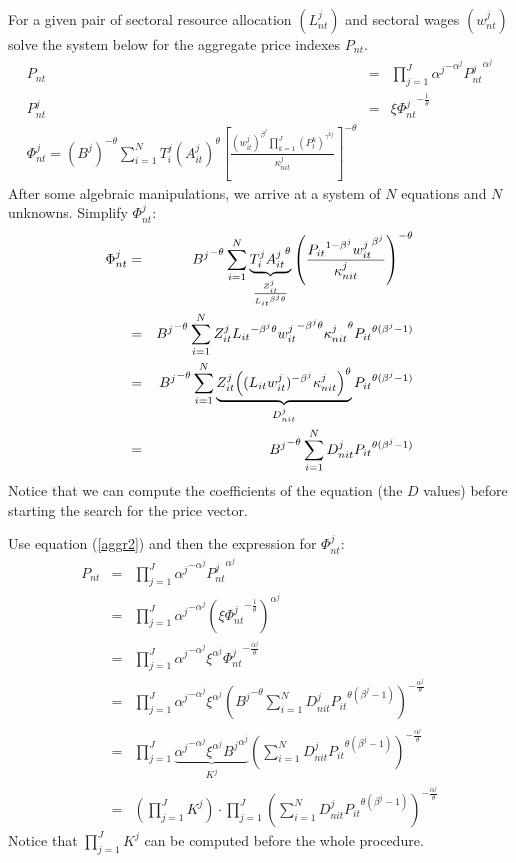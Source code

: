 \documentclass[12pt]{article}
\begin{document}
For a given pair of sectoral resource allocation $(L_{nt}^j)$ and sectoral
wages $(w_{nt}^j)$ solve the system below for the aggregate price indexes $%
P_{nt}.$ 
\begin{eqnarray}
P_{nt} &=& \prod_{j = 1}^J {\alpha^j}^{- \alpha^j} {P_{nt}^j}^{\alpha^j}
\label{aggr1} \\
P_{nt}^j &=& \xi {\Phi_{nt}^j}^{-\frac{1}{\theta}}  \label{aggr2} \\
\Phi _{nt}^{j}=\left( B^{j}\right) ^{-\theta
}\sum\nolimits_{i=1}^{N}T_{i}^{j}\left( A_{it}^{j}\right) ^{\theta }\left[ 
\frac{\left( w_{it}^{j}\right) ^{\beta
^{j}}\prod_{k=1}^{J}(P_{t}^{k})^{\gamma ^{kj}}}{\kappa _{nit}^{j}}\right]
^{-\theta }  \label{eq3}
\end{eqnarray}
After some algebraic manipulations, we arrive at a system of $N$ equations and $N$
unknowns. Simplify $\Phi_{nt}^j:$ 
\begin{eqnarray*}
\Phi_{nt}^j &=& {B^j}^{-\theta} \sum_{i = 1}^N \underbrace{T_i^j {A_{it}^j}%
^{\theta}}_{\frac{Z_{it}^j}{{L_{it}}^{\beta^j\theta}}} \left(\frac{{P_{it}}%
^{1 - \beta^j} {w_{it}^j}^{\beta^j}}{\kappa_{nit}^j}\right)^{-\theta} \\
&=& {B^j}^{-\theta} \sum_{i = 1}^N Z_{it}^j {L_{it}}^{- \beta^j\theta} {%
w_{it}^j}^{-\beta^j\theta} {\kappa_{nit}^j}^{\theta}{P_{it}}^{\theta(\beta^j
- 1)} \\
&=& {B^j}^{-\theta} \sum_{i = 1}^N \underbrace{Z_{it}^j {%
\left((L_{it}w_{it}^j)^{- \beta^j} \kappa_{nit}^j\right)}^{\theta}}%
_{D_{nit}^j} {P_{it}}^{\theta(\beta^j - 1)} \\
&=& {B^j}^{-\theta} \sum_{i = 1}^N D_{nit}^j{P_{it}}^{\theta(\beta^j - 1)}
\end{eqnarray*}
Notice that we can compute the coefficients of the equation (the $D$ values)
before starting the search for the price vector.

Use equation (\ref{aggr2}) and then the expression for $\Phi_{nt}^j$: 
\begin{eqnarray*}
P_{nt} &=& \prod_{j = 1}^J {\alpha^j}^{- \alpha^j} {P_{nt}^j}^{\alpha^j} \\
&=& \prod_{j = 1}^J {\alpha^j}^{- \alpha^j} \left(\xi {\Phi_{nt}^j}^{-\frac{1%
}{\theta}}\right)^{\alpha^j} \\
&=& \prod_{j = 1}^J {\alpha^j}^{- \alpha^j} \xi^{\alpha^j} {\Phi_{nt}^j}^{-%
\frac{\alpha^j}{\theta}} \\
&=& \prod_{j = 1}^J {\alpha^j}^{- \alpha^j} \xi^{\alpha^j} \left({B^j}%
^{-\theta} \sum_{i = 1}^N D_{nit}^j{P_{it}}^{\theta(\beta^j - 1)}\right)^{-%
\frac{\alpha^j}{\theta}} \\
&=& \prod_{j = 1}^J \underbrace{{\alpha^j}^{- \alpha^j} \xi^{\alpha^j} {B^j}%
^{\alpha^j}}_{K^j} \left(\sum_{i = 1}^N D_{nit}^j{P_{it}}^{\theta(\beta^j -
1)}\right)^{-\frac{\alpha^j}{\theta}} \\
&=& \left( \prod_{j = 1}^J K^j \right) \cdot \prod_{j = 1}^J \left(\sum_{i =
1}^N D_{nit}^j {P_{it}}^{\theta(\beta^j - 1)}\right)^{-\frac{\alpha^j}{\theta%
}}
\end{eqnarray*}
Notice that $\prod_{j = 1}^J K^j$ can be computed before the whole procedure.
\end{document}
